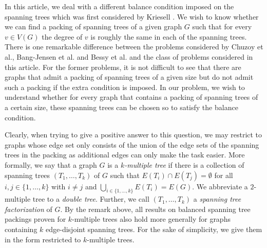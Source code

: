 \documentclass{article}
\theoremstyle{plain}
\newtheorem{Proposition}{Proposition}
\theoremstyle{nonumberplain}
\theoremstyle{nonumberplain}
\newcommand{\stf}{spanning tree factorization }
\begin{document}
In this article, we deal with a different balance condition imposed on the spanning trees which was first considered by Kriesell \cite{nk1}. We wish to know whether we can find a packing of spanning trees of a given graph $G$ such that for every $v \in V(G)$ the degree of $v$ is roughly the same in each of the spanning trees. There is one remarkable difference between the problems considered by Chuzoy et al., Bang-Jensen et al. and Bessy et al. and the class of problems considered in this article. For the former problems, it is not difficult to see that there are graphs that admit a packing of spanning trees of a given size but do not admit such a packing if the extra condition is imposed. In our problem, we wish to understand whether for every graph that contains a packing of spanning trees of a certain size, these spanning trees can be chosen so to satisfy the balance condition.

Clearly, when trying to give a positive answer to this question, we may restrict to graphs whose edge set only consists of the union of the edge sets of the spanning trees in the packing as additional edges can only make the task easier. More formally, we say that a graph $G$ is a {\it $k$-multiple tree} if there is a collection of spanning trees $(T_1,\ldots,T_k)$ of $G$ such that $E(T_i)\cap E(T_j)=\emptyset$ for all $i,j \in \{1,\ldots,k\}$ with $i \neq j$ and $\bigcup_{i \in \{1,\ldots,k\}}E(T_i)=E(G)$. We abbreviate a $2$-multiple tree to a {\it double tree}. Further, we call $(T_1,\ldots,T_k)$ a {\it \stf} of $G$. By the remark above, all results on balanced spanning tree packings proven for $k$-multiple trees also hold more generally for graphs containing $k$ edge-disjoint spanning trees. For the sake of simplicity, we give them in the form restricted to $k$-multiple trees.

\end{document}
